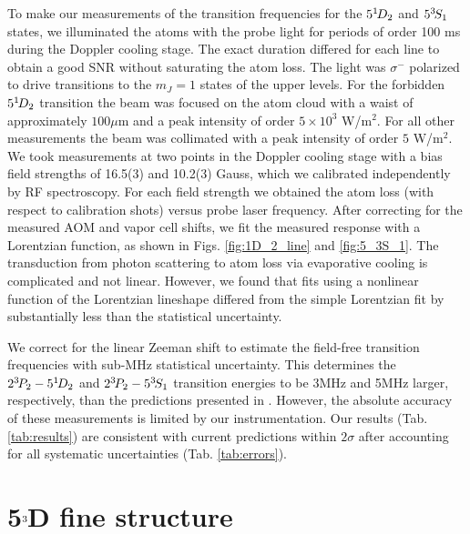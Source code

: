 To make our measurements of the transition frequencies for the $5^{1\!} D_2$ and $5^{3\!} S_1$ states, we illuminated the atoms with the probe light for periods of order 100 ms during the Doppler cooling stage.
	The exact duration differed for each line to obtain a good SNR without saturating the atom loss.
	The light was $\sigma^-$ polarized to drive transitions to the $m_J=1$ states of the upper levels.
	For the forbidden $5^{1\!} D_2$ transition the beam was focused on the atom cloud with a waist of approximately $100\mu$m and a peak intensity of order $5\times 10^3$ W/m$^2$.
	For all other measurements the beam was collimated with a peak intensity of order $ 5$ W/m$^2$.
	We took measurements at two points in the Doppler cooling stage with a bias field strengths of {16.5(3)} and {10.2(3)} Gauss, which we calibrated independently by RF spectroscopy.
	For each field strength we obtained the atom loss (with respect to calibration shots) versus probe laser frequency.
	After correcting for the measured AOM and vapor cell shifts, we fit the measured response with a Lorentzian function, as shown in Figs.
	\ref{fig:1D_2_line} and \ref{fig:5_3S_1}.
	{The transduction from photon scattering to atom loss via evaporative cooling is complicated and not linear.
	However, we found that fits using a nonlinear function of the Lorentzian lineshape differed from the simple Lorentzian fit by substantially less than the statistical uncertainty.}

We correct for the linear Zeeman shift to estimate the field-free transition frequencies with sub-MHz statistical uncertainty.
	This determines the $2^{3\!} P_2-5^{1\!} D_2$ and $2^{3\!} P_2-5^{3\!} S_1$ transition energies to be 3MHz and 5MHz larger, respectively, than the predictions presented in \cite{Drake07}.
	However, the absolute accuracy of these measurements is limited by our instrumentation.
	Our results (Tab.
	\ref{tab:results}) are consistent with current predictions \cite{Drake07} within $2\sigma$ after accounting for all systematic uncertainties (Tab.
	\ref{tab:errors}).


\section{5$^{3\!}$D fine structure}

